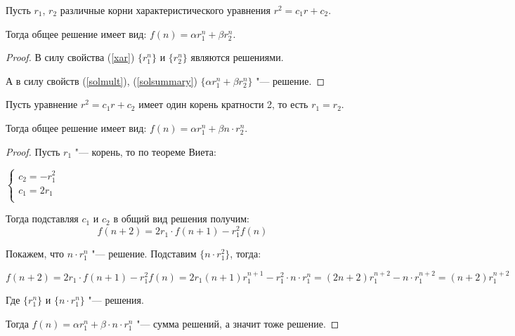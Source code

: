 \begin{theorem}[Решение однородных линейных рекуррентных соотношений
    2"=ого порядка в случае \textit{различных} корней]
    Пусть $r_1$, $r_2$ различные корни характеристического
    уравнения $r^2 = c_1 r + c_2$. 
    
    Тогда общее решение имеет вид:
    $f(n) = \alpha r_1^n + \beta r_2^n$.

    \begin{proof}
        В силу свойства (\ref{xar}) $\{r_1^n\}$ и $\{r_2^n\}$ являются решениями.

        А в силу свойств (\ref{solmult}), (\ref{solsummary}) $\{\alpha r_1^n + \beta r_2^n\}$ "--- решение.
    \end{proof}

\end{theorem}
\begin{theorem}[Решение однородных линейных рекуррентных соотношений
    2"=ого порядка в случае \textit{одинаковых} корней]

    Пусть уравнение $r^2 = c_1r + c_2$ имеет один корень кратности
    2, то есть $r_1 = r_2$.

    Тогда общее решение имеет вид:
    $f(n) = \alpha r_1^n + \beta n \cdot r_2^n$.

    \begin{proof}
        Пусть $r_1$ "--- корень, то по теореме Виета:

        $\begin{cases}
            c_2 = - r_1^2 \\
            c_1 = 2r_1 \\
        \end{cases}$

        Тогда подставляя $c_1$ и $c_2$ в общий вид решения получим:
        \begin{equation*}
            f(n + 2) = 2r_1 \cdot f(n + 1) - r_1^2 f(n) 
        \end{equation*}

        Покажем, что $n \cdot r_1^n$ "--- решение. Подставим $\{n \cdot r_1^2\}$, тогда:
        
        $f(n + 2) = 2r_1 \cdot f(n + 1) - r_1^2 f(n) = 
        2r_1(n + 1) r_1^{n + 1} - r_1^2 \cdot n \cdot r_1^n = (2n + 2) r_1^{n + 2} - n \cdot r_1^{n + 2} = 
        (n + 2) r_1^{n + 2}$ 
        
        Где $\{r_1^n\}$ и $\{n \cdot r_1^n\}$ "--- решения.

        Тогда $f(n) = \alpha r_1^n + \beta \cdot n \cdot r_1^n$ "--- сумма решений, а значит
        тоже решение.
    \end{proof}
\end{theorem}

